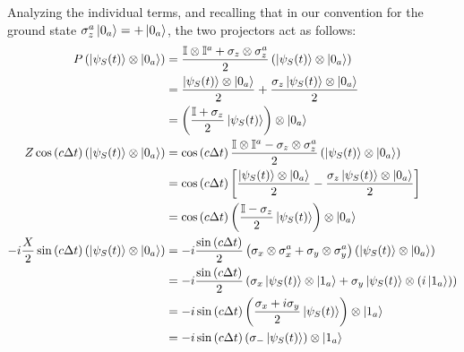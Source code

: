\documentclass[a4paper,12pt]{article}
\begin{document}
Analyzing the individual terms, and recalling that in our convention for the ground state $ \sigma_{z}^{a} \ket{0_{a}} = +\ket{0_{a}} $, the two projectors act as follows: 
\begin{align}
	P \left(\ket{\psi_{S} (t)} \otimes \ket{0_{a}} \right) &= \frac{\mathbb{I} \otimes \mathbb{I}^{a} + \sigma_{z} \otimes  \sigma_{z}^{a}}{2} \left(\ket{\psi_{S} (t)} \otimes \ket{0_{a}} \right) \notag \\
	&= \frac{\ket{\psi_{S} (t)} \otimes \ket{0_{a}}}{2} + \frac{\sigma_{z} \ket{\psi_{S} (t)} \otimes \ket{0_{a}}}{2} \notag \\
	&= \left( \frac{\mathbb{I} + \sigma_{z}}{2} \ket{\psi_{S} (t)} \right) \otimes \ket{0_{a}} \\
	Z \cos \left(c \Delta t\right) \left(\ket{\psi_{S} (t)} \otimes \ket{0_{a}} \right) &= \cos \left(c \Delta t\right) \frac{\mathbb{I} \otimes \mathbb{I}^{a} - \sigma_{z} \otimes \sigma_{z}^{a}}{2} \left(\ket{\psi_{S} (t)} \otimes \ket{0_{a}} \right) \notag \\
	&= \cos \left(c \Delta t\right) \left[ \frac{\ket{\psi_{S} (t)} \otimes \ket{0_{a}}}{2} - \frac{\sigma_{z} \ket{\psi_{S} (t)} \otimes \ket{0_{a}}}{2} \right] \notag \\
	&= \cos \left(c \Delta t\right) \left( \frac{\mathbb{I} - \sigma_{z}}{2} \ket{\psi_{S} (t)} \right) \otimes \ket{0_{a}} \\
	-i \frac{X}{2} \sin \left(c \Delta t\right) \left(\ket{\psi_{S} (t)} \otimes \ket{0_{a}} \right) &= -i \frac{\sin \left(c \Delta t\right)}{2} \left( \sigma_{x} \otimes \sigma_{x}^{a} + \sigma_{y} \otimes \sigma_{y}^{a} \right) \left(\ket{\psi_{S} (t)} \otimes \ket{0_{a}} \right) \notag \\
	&= -i \frac{\sin \left(c \Delta t\right)}{2} \left( \sigma_{x} \ket{\psi_{S} (t)} \otimes \ket{1_{a}} + \sigma_{y} \ket{\psi_{S} (t)} \otimes (i \ket{1_{a}}) \right) \notag \\
	&= -i \sin \left(c \Delta t\right) \left( \frac{\sigma_{x} + i \sigma_{y}}{2} \ket{\psi_{S} (t)} \right) \otimes \ket{1_{a}} \notag \\
	&= -i \sin \left(c \Delta t\right) \left( \sigma_{-} \ket{\psi_{S} (t)} \right) \otimes \ket{1_{a}} 
\end{align}
\end{document}
